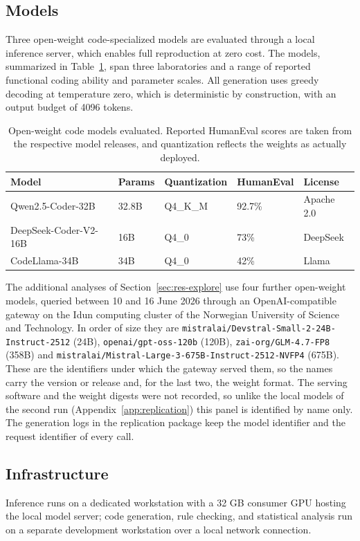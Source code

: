 \documentclass{ieeeaccess}
\begin{document}
\subsection{Models}\label{sec:models}
Three open-weight code-specialized models are evaluated through a local inference
server, which enables full reproduction at zero cost. The models, summarized in
Table~\ref{tab:models}, span three laboratories and a range of reported functional
coding ability and parameter scales. All generation uses greedy decoding at
temperature zero, which is deterministic by construction, with an output budget of
4096 tokens.

\begin{table}[h]
\caption{Open-weight code models evaluated. Reported HumanEval scores are taken from
the respective model releases, and quantization reflects the weights as actually
deployed.}
\label{tab:models}
\centering
\footnotesize
\setlength{\tabcolsep}{2.5pt}
\begin{tabular}{@{}lllll@{}}
\toprule
Model & Params & Quantization & HumanEval & License \\
\midrule
Qwen2.5-Coder-32B & 32.8B & Q4\_K\_M & 92.7\% & Apache 2.0 \\
DeepSeek-Coder-V2-16B & 16B & Q4\_0 & 73\% & DeepSeek \\
CodeLlama-34B & 34B & Q4\_0 & 42\% & Llama \\
\bottomrule
\end{tabular}
\end{table}

The additional analyses of Section~\ref{sec:res-explore} use four further open-weight
models, queried between 10 and 16 June 2026 through an OpenAI-compatible gateway on the
Idun computing cluster of the Norwegian University of Science and Technology. In order of
size they are
\nolinkurl{mistralai/Devstral-Small-2-24B-Instruct-2512} (24B),
\nolinkurl{openai/gpt-oss-120b} (120B), \nolinkurl{zai-org/GLM-4.7-FP8} (358B) and
\nolinkurl{mistralai/Mistral-Large-3-675B-Instruct-2512-NVFP4} (675B). These are the
identifiers under which the gateway served them, so the names carry the version or release
and, for the last two, the weight format. The serving software and the weight digests were
not recorded, so unlike the local models of the second run (Appendix~\ref{app:replication})
this panel is identified by name only. The generation logs in the replication package keep
the model identifier and the request identifier of every call.

\subsection{Infrastructure}\label{sec:infra}
Inference runs on a dedicated workstation with a 32 GB consumer GPU hosting the local
model server; code generation, rule checking, and statistical analysis run on a
separate development workstation over a local network connection.
\end{document}
